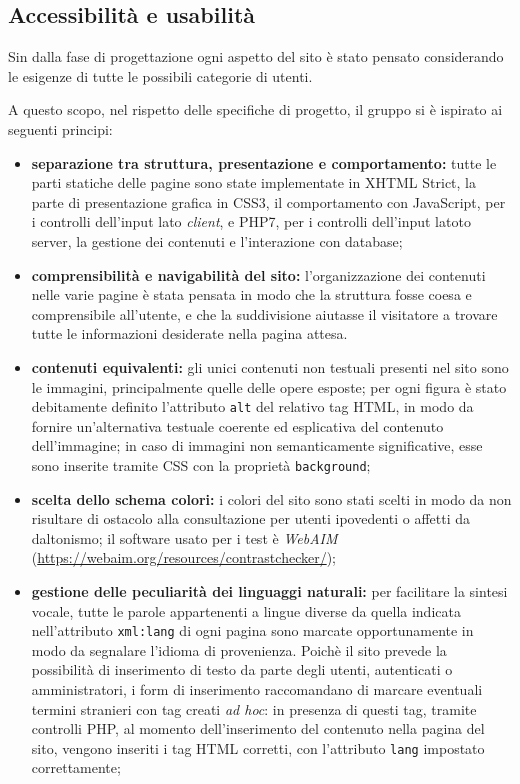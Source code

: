 \subsection{Accessibilità e usabilità}
\label{progettazione-accessibilità-usabilità}
Sin dalla fase di progettazione ogni aspetto del sito è stato pensato considerando le esigenze di tutte le possibili categorie di utenti. 


A questo scopo, nel rispetto delle specifiche di progetto, il gruppo si è ispirato ai seguenti principi:
\begin{itemize}
	\item \textbf{separazione tra struttura, presentazione e comportamento:} tutte le parti statiche delle pagine sono state implementate in XHTML Strict, la parte di presentazione grafica in CSS3, il comportamento con JavaScript, per i controlli dell'input lato \textit{client}, e PHP7, per i controlli dell'input latoto server, la gestione dei contenuti e l'interazione con database;
	\item \textbf{comprensibilità e navigabilità del sito:} l'organizzazione dei contenuti nelle varie pagine è stata pensata in modo che la struttura fosse coesa e comprensibile all'utente, e che la suddivisione aiutasse il visitatore a trovare tutte le informazioni desiderate nella pagina attesa. 
	\item \textbf{contenuti equivalenti:} gli unici contenuti non testuali presenti nel sito sono le immagini, principalmente quelle delle opere esposte; per ogni figura è stato debitamente definito l'attributo \texttt{alt} del relativo tag HTML, in modo da fornire un'alternativa testuale coerente ed esplicativa del contenuto dell'immagine; in caso di immagini non semanticamente significative, esse sono inserite tramite CSS con la proprietà \texttt{background};
	\item \textbf{scelta dello schema colori:} i colori del sito sono stati scelti in modo da non risultare di ostacolo alla consultazione per utenti ipovedenti o affetti da daltonismo; il software usato per i test è \textit{WebAIM} (\url{https://webaim.org/resources/contrastchecker/}); 
	\item \textbf{gestione delle peculiarità dei linguaggi naturali:} per facilitare la sintesi vocale, tutte le parole appartenenti a lingue diverse da quella indicata nell'attributo \texttt{xml:lang} di ogni pagina sono marcate opportunamente in modo da segnalare l'idioma di provenienza. Poichè il sito prevede la possibilità di inserimento di testo da parte degli utenti, autenticati o amministratori, i form di inserimento raccomandano di marcare eventuali termini stranieri con tag creati \textit{ad hoc}: in presenza di questi tag, tramite controlli PHP, al momento dell'inserimento del contenuto nella pagina del sito, vengono inseriti i tag HTML corretti, con l'attributo \texttt{lang} impostato correttamente;

\end{itemize}
